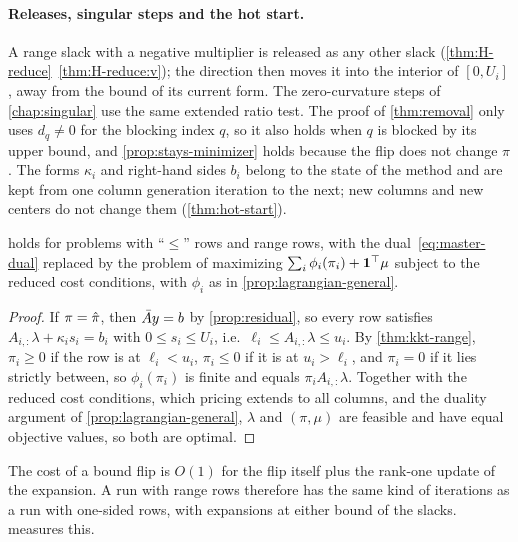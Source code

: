 \paragraph{Releases, singular steps and the hot start.} A range slack with a negative
multiplier is released as any other slack (\cref{thm:H-reduce}~\ref{thm:H-reduce:v}); the
direction then moves it into the interior of $[0,U_i]$, away from the bound of its current form.
The zero-curvature steps of \cref{chap:singular} use the same extended ratio test. The proof of
\cref{thm:removal} only uses $d_q\ne0$ for the blocking index $q$, so it also holds when $q$ is
blocked by its upper bound, and \cref{prop:stays-minimizer} holds because the flip does not
change $\pi$. The forms $\kappa_i$ and right-hand sides $b_i$ belong to the state of the method
and are kept from one column generation iteration to the next; new columns and new centers do
not change them (\cref{thm:hot-start}).

\begin{cor} \label{cor:range-termination}
 holds for problems with ``$\le$'' rows and range rows, with the
dual~\eqref{eq:master-dual} replaced by the problem of maximizing
$\sum_i\phi_i(\pi_i) + \mathbf{1}^\top\mu$ subject to the reduced cost conditions, with $\phi_i$ as in
\cref{prop:lagrangian-general}.
\end{cor}

\begin{proof}
If $\pi = \hat{\pi}$, then $\bar{A} y = b$ by \cref{prop:residual}, so every row satisfies
$A_{i,:}\lambda + \kappa_is_i = b_i$ with $0\le s_i\le U_i$, i.e.\ $\ell_i\le A_{i,:}\lambda\le u_i$. By
\cref{thm:kkt-range}, $\pi_i\ge0$ if the row is at $\ell_i<u_i$, $\pi_i\le0$ if it is at
$u_i>\ell_i$, and $\pi_i = 0$ if it lies strictly between, so $\phi_i(\pi_i)$ is finite and equals
$\pi_iA_{i,:}\lambda$. Together with the reduced cost conditions, which pricing extends to all
columns, and the duality argument of \cref{prop:lagrangian-general}, $\lambda$ and $(\pi,\mu)$
are feasible and have equal objective values, so both are optimal.
\end{proof}

The cost of a bound flip is $O(1)$ for the flip itself plus the rank-one update of the
expansion. A run with range rows therefore has the same kind of iterations as a run with
one-sided rows, with expansions at either bound of the slacks. 
measures this.
